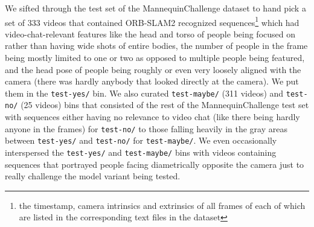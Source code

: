 We sifted through the test set of the MannequinChallenge dataset to hand pick a set of 333 videos that contained ORB-SLAM2 recognized sequences\footnote{the timestamp, camera intrinsics and extrinsics of all frames of each of which are listed in the corresponding text files in the dataset} which had video-chat-relevant features like the head and torso of people being focused on rather than having wide shots of entire bodies, the number of people in the frame being mostly limited to one or two as opposed to multiple people being featured, and the head pose of people being roughly or even very loosely aligned with the camera (there was hardly anybody that looked directly at the camera). We put them in the \texttt{test-yes/} bin. We also curated \texttt{test-maybe/} (311 videos) and \texttt{test-no/} (25 videos) bins that consisted of the rest of the MannequinChallenge test set with sequences either having no relevance to video chat (like there being hardly anyone in the frames) for \texttt{test-no/} to those falling heavily in the gray areas between \texttt{test-yes/} and \texttt{test-no/} for \texttt{test-maybe/}. We even occasionally interspersed the \texttt{test-yes/} and \texttt{test-maybe/} bins with videos containing sequences that portrayed people facing diametrically opposite the camera just to really challenge the model variant being tested.

